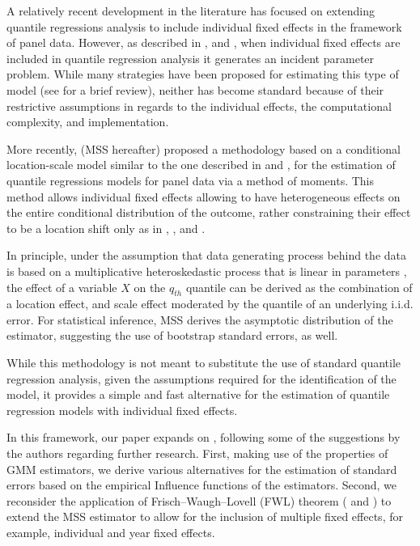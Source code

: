 \documentclass[
  authoryear,
  preprint,
  1p]{elsarticle}
\begin{document}
A relatively recent development in the literature has focused on
extending quantile regressions analysis to include individual fixed
effects in the framework of panel data. However, as described in
\citet{neymanscott1948}, and \citet{lancaster2000}, when individual
fixed effects are included in quantile regression analysis it generates
an incident parameter problem. While many strategies have been proposed
for estimating this type of model (see \citet{galvao2017quantile} for a
brief review), neither has become standard because of their restrictive
assumptions in regards to the individual effects, the computational
complexity, and implementation.

More recently, \citet{mss2019} (MSS hereafter) proposed a methodology
based on a conditional location-scale model similar to the one described
in \citet{he1997} and \citet{zhao2000}, for the estimation of quantile
regressions models for panel data via a method of moments. This method
allows individual fixed effects allowing to have heterogeneous effects
on the entire conditional distribution of the outcome, rather
constraining their effect to be a location shift only as in
\citet{canay2011}, \citet{koenker2004}, and \citet{lancaster2000}.

In principle, under the assumption that data generating process behind
the data is based on a multiplicative heteroskedastic process that is
linear in parameters \citep[\citet{mss2019}, \citet{he1997},
\citet{zhao2000}]{cameron2005}, the effect of a variable \(X\) on the
\(q_{th}\) quantile can be derived as the combination of a location
effect, and scale effect moderated by the quantile of an underlying
i.i.d. error. For statistical inference, MSS derives the asymptotic
distribution of the estimator, suggesting the use of bootstrap standard
errors, as well.

While this methodology is not meant to substitute the use of standard
quantile regression analysis, given the assumptions required for the
identification of the model, it provides a simple and fast alternative
for the estimation of quantile regression models with individual fixed
effects.

In this framework, our paper expands on \citet{mss2019}, following some
of the suggestions by the authors regarding further research. First,
making use of the properties of GMM estimators, we derive various
alternatives for the estimation of standard errors based on the
empirical Influence functions of the estimators. Second, we reconsider
the application of Frisch--Waugh--Lovell (FWL) theorem
(\citet{frishwaugh1933} and \citet{lovell1963}) to extend the MSS
estimator to allow for the inclusion of multiple fixed effects, for
example, individual and year fixed effects.
\end{document}
